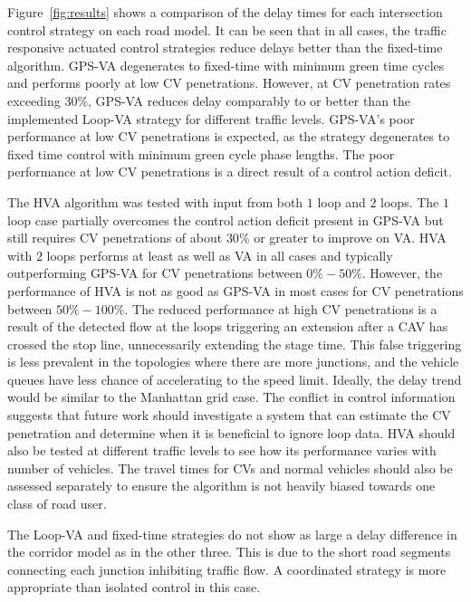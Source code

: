 \documentclass[numbered]{trbunofficial}
\begin{document}
Figure~\ref{fig:results} shows a comparison of the delay times for each intersection control strategy on each road model. It can be seen that in all cases, the traffic responsive actuated control strategies reduce delays better than the fixed-time algorithm. GPS-VA degenerates to fixed-time with minimum green time cycles and performs poorly at low CV penetrations. However, at CV penetration rates exceeding $30\%$, GPS-VA reduces delay comparably to or better than the implemented Loop-VA strategy for different traffic levels. GPS-VA's poor performance at low CV penetrations is expected, as the strategy degenerates to fixed time control with minimum green cycle phase lengths. The poor performance at low CV penetrations is a direct result of a control action deficit.

The HVA algorithm was tested with input from both $1$ loop and $2$ loops. The $1$ loop case partially overcomes the control action deficit present in GPS-VA but still requires CV penetrations of about $30\%$ or greater to improve on VA. HVA with $2$ loops performs at least as well as VA in all cases and typically outperforming GPS-VA for CV penetrations between $0\%-50\%$. However, the performance of HVA is not as good as GPS-VA in most cases for CV penetrations between $50\%-100\%$. The reduced performance at high CV penetrations is a result of the detected flow at the loops triggering an extension after a CAV has crossed the stop line, unnecessarily extending the stage time. This false triggering is less prevalent in the topologies where there are more junctions, and the vehicle queues have less chance of accelerating to the speed limit. Ideally, the delay trend would be similar to the Manhattan grid case. The conflict in control information suggests that future work should investigate a system that can estimate the CV penetration and determine when it is beneficial to ignore loop data. HVA should also be tested at different traffic levels to see how its performance varies with number of vehicles. The travel times for CVs and normal vehicles should also be assessed separately to ensure the algorithm is not heavily biased towards one class of road user.

The Loop-VA and fixed-time strategies do not show as large a delay difference in the corridor model as in the other three. This is due to the short road segments connecting each junction inhibiting traffic flow. A coordinated strategy is more appropriate than isolated control in this case.

\end{document}
